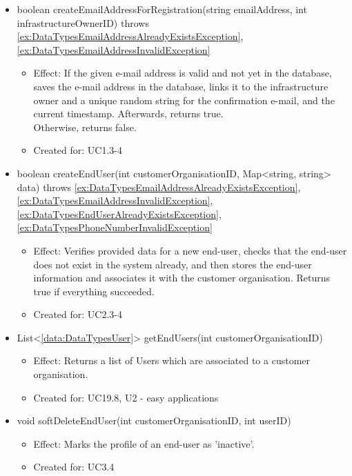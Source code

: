 \begin{description}
\begin{itemize}[noitemsep,nolistsep,leftmargin=-.25cm]
      \item \textsf{boolean createEmailAddressForRegistration(string emailAddress, int infrastructureOwnerID) throws \ref{ex:DataTypesEmailAddressAlreadyExistsException}, \ref{ex:DataTypesEmailAddressInvalidException}}
        \begin{itemize}[noitemsep,nolistsep]
           \item Effect: If the given e-mail address is valid and not yet in the database, saves the e-mail address
in the database, links it to the infrastructure owner and a unique random string for the confirmation e-mail,
and the current timestamp. Afterwards, returns true. \\
Otherwise, returns false.
\item Created for: UC1.3-4
        \end{itemize}
      \item \textsf{boolean createEndUser(int customerOrganisationID, Map\textless{}string, string\textgreater{} data) throws \ref{ex:DataTypesEmailAddressAlreadyExistsException}, \ref{ex:DataTypesEmailAddressInvalidException}, \ref{ex:DataTypesEndUserAlreadyExistsException}, \ref{ex:DataTypesPhoneNumberInvalidException}}
        \begin{itemize}[noitemsep,nolistsep]
           \item Effect: Verifies provided data for a new end-user, checks that the end-user does not exist in the system already, and then stores the end-user information and associates it with the customer organisation. Returns true if everything succeeded.
\item Created for: UC2.3-4
        \end{itemize}
      \item \textsf{List\textless{}\ref{data:DataTypesUser}\textgreater{} getEndUsers(int customerOrganisationID)}
        \begin{itemize}[noitemsep,nolistsep]
           \item Effect: Returns a list of Users which are associated to a customer organisation.
\item Created for: UC19.8, U2 - easy applications
        \end{itemize}
      \item \textsf{void softDeleteEndUser(int customerOrganisationID, int userID)}
        \begin{itemize}[noitemsep,nolistsep]
           \item Effect: Marks the profile of an end-user as 'inactive'.
\item Created for: UC3.4
        \end{itemize}
    \end{itemize}
    \end{description}

